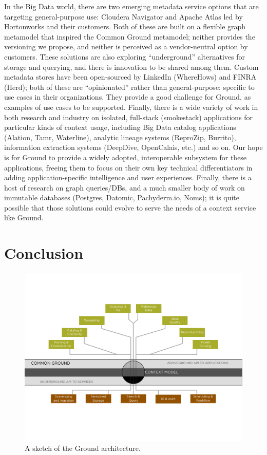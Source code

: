 \documentclass{sig-alternate}
\begin{document}
In the Big Data world, there are two emerging metadata service options that are targeting general-purpose use: Cloudera Navigator and Apache Atlas led by Hortonworks and their customers. Both of these are built on a flexible graph metamodel that inspired the Common Ground \mantle metamodel; neither provides the \core versioning we propose, and neither is perceived as a vendor-neutral option by customers.  These solutions are also exploring ``underground'' alternatives for storage and querying, and there is innovation to be shared among them. Custom metadata stores have been open-sourced by LinkedIn (WhereHows) and FINRA (Herd); both of these are ``opinionated'' rather than general-purpose: specific to use cases in their organizations. They provide a good challenge for Ground, as examples of use cases to be supported. Finally, there is a wide variety of work in both research and industry on isolated, full-stack (smokestack) applications for particular kinds of context usage, including Big Data catalog applications (Alation, Tamr, Waterline), analytic lineage systems (ReproZip, Burrito), information extraction systems (DeepDive, OpenCalais, etc.) and so on. Our hope is for Ground to provide a widely adopted, interoperable subsystem for these applications, freeing them to focus on their own key technical differentiators in adding application-specific intelligence and user experiences.  Finally, there is a host of research on graph queries/DBs, and a much smaller body of work on immutable databases (Postgres, Datomic, Pachyderm.io, Noms); it is quite possible that those solutions could evolve to serve the needs of a context service like Ground.
\section{Conclusion}
\label{sec:conclusion}

\begin{figure}[th]
\centering
\includegraphics[width=0.75\linewidth]{groundarch.pdf}
\caption{A sketch of the Ground architecture.}
\label{fig:arch}
\end{figure}
\end{document}
